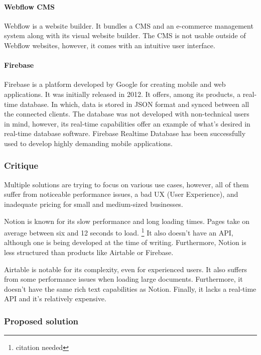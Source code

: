 \documentclass[
  12pt,
  a4paper,
]{article}
\begin{document}
\hypertarget{webflow-cms}{%
\paragraph{Webflow CMS}\label{webflow-cms}}

Webflow is a website builder. It bundles a CMS and an e-commerce
management system along with its visual website builder. The CMS is not
usable outside of Webflow websites, however, it comes with an intuitive
user interface.

\hypertarget{firebase}{%
\paragraph{Firebase}\label{firebase}}

Firebase is a platform developed by Google for creating mobile and web
applications. It was initially released in 2012. It offers, among its
products, a real-time database. In which, data is stored in JSON format
and synced between all the connected clients. The database was not
developed with non-technical users in mind, however, its real-time
capabilities offer an example of what's desired in real-time database
software. Firebase Realtime Database has been successfully used to
develop highly demanding mobile applications.

\hypertarget{critique}{%
\subsubsection{Critique}\label{critique}}

Multiple solutions are trying to focus on various use cases, however,
all of them suffer from noticeable performance issues, a bad UX (User
Experience), and inadequate pricing for small and medium-sized
businesses.

Notion is known for its slow performance and long loading times. Pages
take on average between six and 12 seconds to load. \footnote{citation
  needed} It also doesn't have an API, although one is being developed
at the time of writing. Furthermore, Notion is less structured than
products like Airtable or Firebase.

Airtable is notable for its complexity, even for experienced users. It
also suffers from some performance issues when loading large documents.
Furthermore, it doesn't have the same rich text capabilities as Notion.
Finally, it lacks a real-time API and it's relatively expensive.

\hypertarget{proposed-solution}{%
\subsubsection{Proposed solution}\label{proposed-solution}}
\end{document}
